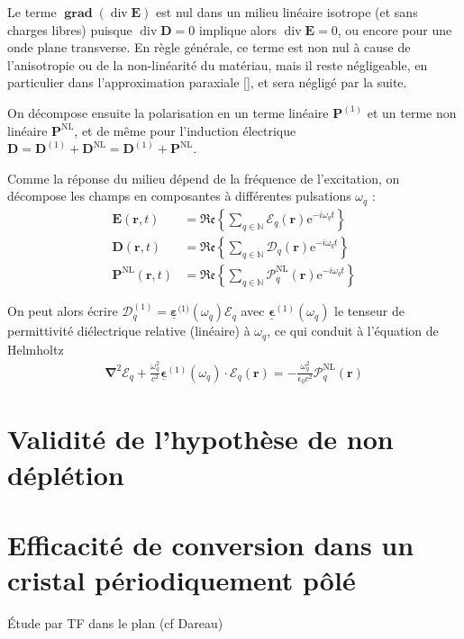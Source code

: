 \documentclass[11pt,a4paper] { article}
\newcommand{\ncite}[1]{[\citenum{#1}]}
\DeclareMathOperator{\divg}{div}
\DeclareMathOperator{\grad}{\mathbf{grad}}
\newcommand{\E}{\mathcal{E}}
\newcommand{\e}[1]{\text{e}^{#1}}
\newcommand{\mathsc}[1]{\mathrm{\scriptscriptstyle {#1}}}
\renewcommand{\v}[1]{\boldsymbol{\mathbf{#1}}}
\newcommand{\tens}[1]{\boldsymbol{\underline{#1}}}
\begin{document}
Le terme $\grad (\divg \v E)$ est nul dans un milieu linéaire isotrope (et sans charges libres) puisque $\divg \v D=0$ implique alors $\divg \v E = 0$, ou encore pour une onde plane transverse. En règle générale, ce terme est non nul à cause de l'anisotropie ou de la non-linéarité du matériau, mais il reste négligeable, en particulier dans l'approximation paraxiale \ncite{boyd}, et sera négligé par la suite.



On décompose ensuite la polarisation en un terme linéaire $\v P^\mathsc{(1)}$ et un terme non linéaire $\v P^\mathsc{NL}$, et de même pour l'induction électrique $\v D = \v D^\mathsc{(1)} + \v D^\mathsc{NL} = \v D^\mathsc{(1)} + \v P^\mathsc{NL}$. 

Comme la réponse du milieu dépend de la fréquence de l'excitation, on décompose les champs en composantes à différentes pulsations $\omega_q$ :
\begin{align*}
	\v E(\v r, t) &= \mathfrak{Re} \left\{ \sum_{q \in \mathbb N} \v {\boldsymbol{\mathcal E}}_q (\v r) \e{-i \omega_q t} \right\} \\
	\v D(\v r, t) &= \mathfrak{Re} \left\{ \sum_{q \in \mathbb N} \v {\boldsymbol{\mathcal D}}_q (\v r) \e{-i \omega_q t} \right\} \\
	\v P^\mathsc{NL}(\v r, t) &= \mathfrak{Re} \left\{ \sum_{q \in \mathbb N} \v {\boldsymbol{\mathcal P}}^\mathsc{NL}_q (\v r) \e{-i \omega_q t} \right\}
\end{align*}

On peut alors écrire $\v {\boldsymbol{\mathcal D}}^\mathsc{(1)}_q = \tens \varepsilon^{\mathsc(1)}(\omega_q) \v {\boldsymbol{\mathcal E}}_q$ avec $\tens \epsilon^{(1)}(\omega_q)$ le tenseur de permittivité diélectrique relative (linéaire) à $\omega_q$, ce qui conduit à l'équation de Helmholtz  \citep{boyd}
\begin{align*}
	\boldsymbol{\nabla}^2 \boldsymbol{\E}_q + \frac{\omega_q^2}{c^2}\tens\epsilon^{(1)}(\omega_q)\cdot \v \E_q(\v r) = - \frac{\omega_q^2}{\epsilon_0 c^2} \boldsymbol{\mathcal{P}}^\mathsc{NL}_q(\v r)
\end{align*}

\section{Validité de l'hypothèse de non déplétion}
\label{ndepl}

\section{Efficacité de conversion dans un  cristal périodiquement pôlé}
Étude par TF dans le plan (cf Dareau)
\label{BK}
\end{document}

